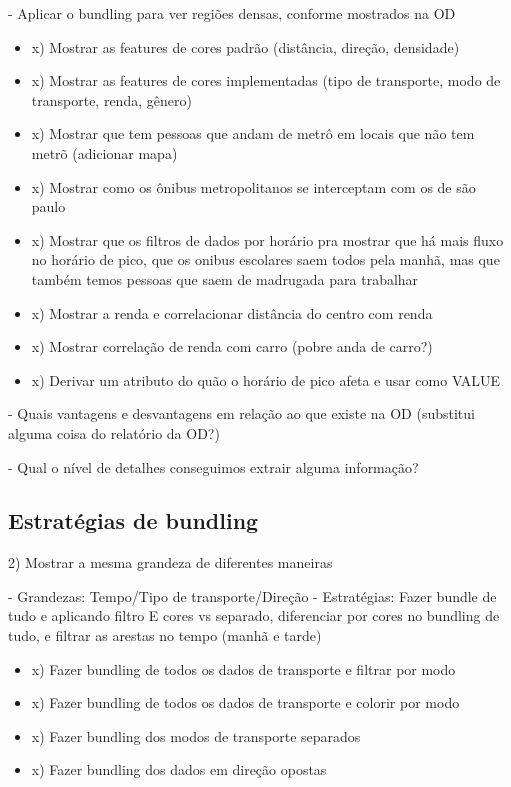 - Aplicar o bundling para ver regiões densas, conforme mostrados na OD

  \begin{itemize}
    \item x) Mostrar as features de cores padrão (distância, direção, densidade)
    \item x) Mostrar as features de cores implementadas (tipo de transporte, modo de transporte, renda, gênero)
    \item x) Mostrar que tem pessoas que andam de metrô em locais que não tem metrõ (adicionar mapa)
    \item x) Mostrar como os ônibus metropolitanos se interceptam com os de são paulo
    \item x) Mostrar que os filtros de dados por horário pra mostrar que há mais fluxo
       no horário de pico, que os onibus escolares saem todos pela manhã, mas que também temos
      pessoas que saem de madrugada para trabalhar
    \item x) Mostrar a renda e correlacionar distância do centro com renda
    \item x) Mostrar correlação de renda com carro (pobre anda de carro?)
    \item x) Derivar um atributo do quão o horário de pico afeta e usar como VALUE
  \end{itemize}

	- Quais vantagens e desvantagens em relação ao que existe na OD (substitui alguma coisa do relatório da OD?)

	- Qual o nível de detalhes conseguimos extrair alguma informação?

  
\subsection{Estratégias de bundling}

2) Mostrar a mesma grandeza de diferentes maneiras

- Grandezas: Tempo/Tipo de transporte/Direção
- Estratégias: Fazer bundle de tudo e aplicando filtro E cores vs separado,
diferenciar por cores no bundling de tudo, e filtrar as arestas no tempo (manhã
e tarde)

  \begin{itemize}
    \item x) Fazer bundling de todos os dados de transporte e filtrar por modo
    \item x) Fazer bundling de todos os dados de transporte e colorir por modo
    \item x) Fazer bundling dos modos de transporte separados
    \item x) Fazer bundling dos dados em direção opostas
  \end{itemize}

